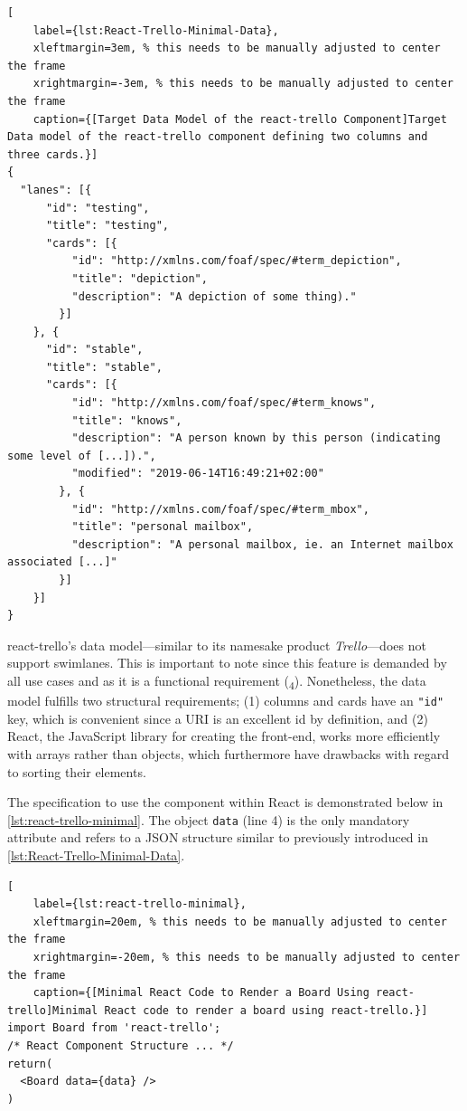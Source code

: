 \begin{spacing}{0.9}
    \lstset{language=JavaScript}
    \begin{lstlisting}[
    label={lst:React-Trello-Minimal-Data},
    xleftmargin=3em, % this needs to be manually adjusted to center the frame
    xrightmargin=-3em, % this needs to be manually adjusted to center the frame
    caption={[Target Data Model of the react-trello Component]Target Data model of the react-trello component defining two columns and three cards.}]
{
  "lanes": [{
      "id": "testing",
      "title": "testing",
      "cards": [{
          "id": "http://xmlns.com/foaf/spec/#term_depiction",
          "title": "depiction",
          "description": "A depiction of some thing)."
        }]
    }, {
      "id": "stable",
      "title": "stable",
      "cards": [{
          "id": "http://xmlns.com/foaf/spec/#term_knows",
          "title": "knows",
          "description": "A person known by this person (indicating some level of [...]).",
          "modified": "2019-06-14T16:49:21+02:00"
        }, {
          "id": "http://xmlns.com/foaf/spec/#term_mbox",
          "title": "personal mailbox",
          "description": "A personal mailbox, ie. an Internet mailbox associated [...]"
        }]
    }]
}
\end{lstlisting}
\end{spacing}


\noindent react-trello’s data model—similar to its namesake product \textit{Trello}—does not support swimlanes. This is important to note since this feature is demanded by all use cases and as it is a functional requirement (\textsubscript{4}). Nonetheless, the data model fulfills two structural requirements; (1) columns and cards have an \texttt{"id"} key, which is convenient since a \acrshort*{URI} is an excellent id by definition, and (2) React, the JavaScript library for creating the front-end, works more efficiently with arrays rather than objects, which furthermore have drawbacks with regard to sorting their elements.

The specification to use the component within React is demonstrated below in \autoref{lst:react-trello-minimal}. The object \texttt{data} (line 4) is the only mandatory attribute and refers to a \acrshort*{JSON} structure similar to previously introduced in \autoref{lst:React-Trello-Minimal-Data}.

\begin{spacing}{0.9}
    \lstset{language=JavaScript}
    \begin{lstlisting}[
    label={lst:react-trello-minimal},
    xleftmargin=20em, % this needs to be manually adjusted to center the frame
    xrightmargin=-20em, % this needs to be manually adjusted to center the frame
    caption={[Minimal React Code to Render a Board Using react-trello]Minimal React code to render a board using react-trello.}]
import Board from 'react-trello';
/* React Component Structure ... */
return(
  <Board data={data} />
)
    \end{lstlisting}
\end{spacing}

